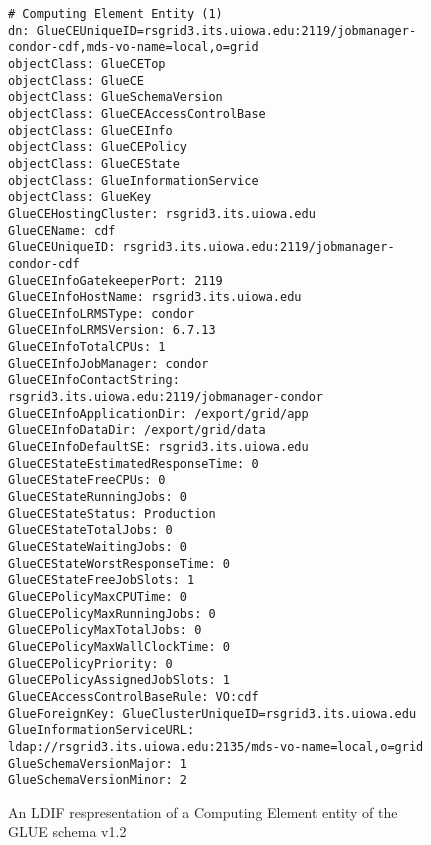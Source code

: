 \documentclass[12pt]{article}
\begin{document}
\begin{figure}
\scriptsize
\begin{verbatim}
# Computing Element Entity (1)
dn: GlueCEUniqueID=rsgrid3.its.uiowa.edu:2119/jobmanager-condor-cdf,mds-vo-name=local,o=grid
objectClass: GlueCETop
objectClass: GlueCE
objectClass: GlueSchemaVersion
objectClass: GlueCEAccessControlBase
objectClass: GlueCEInfo
objectClass: GlueCEPolicy
objectClass: GlueCEState
objectClass: GlueInformationService
objectClass: GlueKey
GlueCEHostingCluster: rsgrid3.its.uiowa.edu
GlueCEName: cdf
GlueCEUniqueID: rsgrid3.its.uiowa.edu:2119/jobmanager-condor-cdf
GlueCEInfoGatekeeperPort: 2119
GlueCEInfoHostName: rsgrid3.its.uiowa.edu
GlueCEInfoLRMSType: condor
GlueCEInfoLRMSVersion: 6.7.13
GlueCEInfoTotalCPUs: 1
GlueCEInfoJobManager: condor
GlueCEInfoContactString: rsgrid3.its.uiowa.edu:2119/jobmanager-condor
GlueCEInfoApplicationDir: /export/grid/app
GlueCEInfoDataDir: /export/grid/data
GlueCEInfoDefaultSE: rsgrid3.its.uiowa.edu
GlueCEStateEstimatedResponseTime: 0
GlueCEStateFreeCPUs: 0
GlueCEStateRunningJobs: 0
GlueCEStateStatus: Production
GlueCEStateTotalJobs: 0
GlueCEStateWaitingJobs: 0
GlueCEStateWorstResponseTime: 0
GlueCEStateFreeJobSlots: 1
GlueCEPolicyMaxCPUTime: 0
GlueCEPolicyMaxRunningJobs: 0
GlueCEPolicyMaxTotalJobs: 0
GlueCEPolicyMaxWallClockTime: 0
GlueCEPolicyPriority: 0
GlueCEPolicyAssignedJobSlots: 1
GlueCEAccessControlBaseRule: VO:cdf
GlueForeignKey: GlueClusterUniqueID=rsgrid3.its.uiowa.edu
GlueInformationServiceURL: ldap://rsgrid3.its.uiowa.edu:2135/mds-vo-name=local,o=grid
GlueSchemaVersionMajor: 1
GlueSchemaVersionMinor: 2
\end{verbatim}
\normalsize
\caption[Example of an LDIF Representation of the GLUE
Schema]{\label{LDIF-CE-1-Example}  An LDIF respresentation
of a Computing Element entity of the GLUE schema v1.2}
\end{figure}
\end{document}
